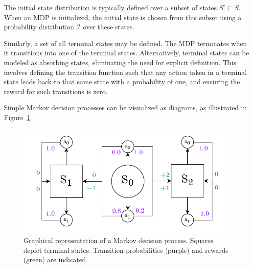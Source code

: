 \documentclass[
  digital,     %
  oneside,     %
  nosansbold,  %
  nocolorbold, %
  lof,         %
  lot,         %
]{fithesis4}
\begin{document}
The initial state distribution is typically defined over a subset of states $S^i \subseteq S$. When an MDP is initialized, the initial state is chosen from this subset using a probability distribution $\mathcal{I}$ over these states.

Similarly, a set of all terminal states may be defined. The MDP terminates when it transitions into one of the terminal states. Alternatively, terminal states can be modeled as absorbing states, eliminating the need for explicit definition. This involves defining the transition function such that any action taken in a terminal state leads back to that same state with a probability of one, and ensuring the reward for such transitions is zero.

Simple Markov decision processes can be visualized as diagrams, as illustrated in Figure~\ref{fig:mdp}.

\begin{figure}
    \centering
    \includegraphics[width=1\linewidth]{diagrams/mdp.pdf}
    \caption{Graphical representation of a Markov decision process. Squares depict terminal states. Transition probabilities (purple) and rewards (green) are indicated.}
    \label{fig:mdp}
\end{figure}
\end{document}
